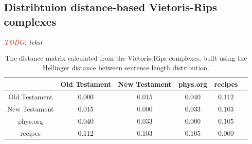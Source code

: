 \documentclass[12pt,a4paper]{amsart}
\begin{document}
\subsection{Distribtuion distance-based Vietoris-Rips complexes}

\emph{\textcolor{red}{TODO}: tekst}

\begin{table}
  \centering
  \begin{tabular}{c|ccccc}
                  & Old Testament & New Testament & phys.org & recipes \\ \hline
    Old Testament & $0.000$ & $0.015$ & $0.040$ & $0.112$ \\
    New Testament & $0.015$ & $0.000$ & $0.033$ & $0.103$ \\
    phys.org      & $0.040$ & $0.033$ & $0.000$ & $0.105$ \\
    recipes       & $0.112$ & $0.103$ & $0.105$ & $0.000$ \\
  \end{tabular}

  \caption{The distance matrix calculated from the Vietoris-Rips complexes,
    built using the Hellinger distance between sentence length distribution.}
  \label{tab:hell}
\end{table}
\end{document}
